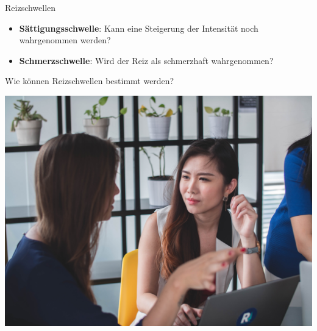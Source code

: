\documentclass[aspectratio=169]{beamer}
\begin{document}
\begin{frame}{Reizschwellen}
\begin{itemize}
\begin{columns}[c]
\begin{column}{3.2cm}
    \end{column}
    
\end{columns}

$\,$\\


    \item
\textbf{Sättigungsschwelle}: Kann eine Steigerung der Intensität noch wahrgenommen werden?

    \item
\textbf{Schmerzschwelle}: Wird der Reiz als schmerzhaft wahrgenommen?
\end{itemize}
    
    
\end{frame}


\begin{frame}{Wie können Reizschwellen bestimmt werden?}

\begin{center}
    \includegraphics[width=\textwidth]{zweiergespraech.jpg}
\end{center}

    
\end{frame}
\end{document}

